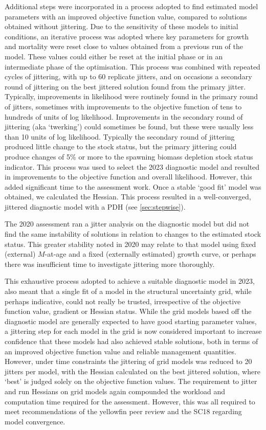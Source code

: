 Additional steps were incorporated in a process adopted to find estimated model parameters with an improved objective function value, compared to solutions obtained without jittering. Due to the sensitivity of these models to initial conditions, an iterative process was adopted where key parameters for growth and mortality were reset close to values obtained from a previous run of the model. These values could either be reset at the initial phase or in an intermediate phase of the optimisation. This process was combined with repeated cycles of jittering, with up to 60 replicate jitters, and on occasions a secondary round of jittering on the best jittered solution found from the primary jitter. Typically, improvements in likelihood were routinely found in the primary round of jitters, sometimes with improvements to the objective function of tens to hundreds of units of log likelihood. Improvements in the secondary round of jittering (aka `twerking') could sometimes be found, but these were usually less than 10 units of log likelihood. Typically the secondary round of jittering produced little change to the stock status, but the primary jittering could produce changes of 5\% or more to the spawning biomass depletion stock status indicator. This process was used to select the 2023 diagnostic model and resulted in improvements to the objective function and overall likelihood. However, this added significant time to the assessment work. Once a stable `good fit' model was obtained, we calculated the Hessian. This process resulted in a well-converged, jittered diagnostic model with a PDH (see \autoref{sec:stepwise}).

The 2020 assessment ran a jitter analysis on the diagnostic model but did not find the same instability of solutions in relation to changes to the estimated stock status. This greater stability noted in 2020 may relate to that model using fixed (external) $M$-at-age and a fixed (externally estimated) growth curve, or perhaps there was insufficient time to investigate jittering more thoroughly.

This exhaustive process adopted to achieve a suitable diagnostic model in 2023, also meant that a single fit of a model in the structural uncertainty grid, while perhaps indicative, could not really be trusted, irrespective of the objective function value, gradient or Hessian status. While the grid models based off the diagnostic model are generally expected to have good starting parameter values, a jittering step for each model in the grid is now considered important to increase confidence that these models had also achieved stable solutions, both in terms of an improved objective function value and reliable management quantities. However, under time constraints the jittering of grid models was reduced to 20 jitters per model, with the Hessian calculated on the best jittered solution, where `best' is judged solely on the objective function values. The requirement to jitter and run Hessians on grid models again compounded the workload and computation time required for the assessment. However, this was all required to meet recommendations of the yellowfin peer review and the SC18 regarding model convergence.

